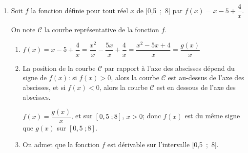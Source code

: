 \documentclass[10pt]{article}
\begin{document}
\begin{enumerate}
\begin{enumerate}
Donc:  $y_{\text{A}_{n+1}} - y_{\text{A}_{n}} = \left (n^2-3n\right ) - \left (n^2-5n+4\right ) = n^2 -3n -n^2 +5n -4=2n-4$.

Or $x_{\text{A}_{n+1}} - x_{\text{A}_{n}} = n+1-n=1$;
donc $a_n=\dfrac{y_{\text{A}_{n+1}} - y_{\text{A}_n}}{x_{\text{A}_{n+1}} - x_{\text{A}_n}} = \dfrac{2n-4}{1}=2n-4$.



		\item 
$a_{n+1}-a_n= \left (2(n+1)-4\right ) - \left (2n-4\right ) = 2n+2-4-2n+4=2$

Donc la suite $(a_n)$ est arithmétique de raison 2.
	\end{enumerate}
	
\item Soit $f$ la fonction définie pour tout réel $x$ de [0,5~;~8] par
$f(x) = x - 5 + \dfrac 4 x.$

On note $\mathcal{C}$ la courbe représentative de la fonction $f$.
	\begin{enumerate}
		\item 
$f(x) = x - 5 + \dfrac 4 x = \dfrac{x^2}{x} - \dfrac{5x}{x} + \dfrac{4}{x}= \dfrac{x^2-5x+4}{x}=\dfrac{g(x)}{x}$		

		\item 
La position de la courbe $\mathcal{C}$ par rapport à l'axe des abscisses dépend du signe de $f(x)$: si $f(x)>0$, alors la courbe $\mathcal{C}$ est au-dessus de l'axe des abscisses, et  si $f(x) < 0$, alors la courbe $\mathcal{C}$ est en dessous de l'axe des abscisses.

$f(x)=\dfrac{g(x)}{x}$, et sur $[0,5\;; 8]$, $x>0$; donc $f(x)$ est du même signe que $g(x)$ sur  $[0,5\;; 8]$.

\medskip


		\item On admet que la fonction $f$ est dérivable sur l'intervalle [0,5~;~8].



\end{enumerate}
\end{enumerate}
\end{document}
